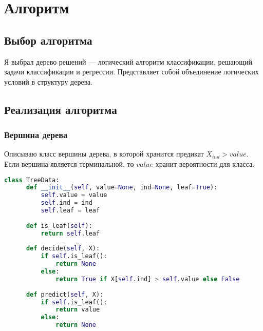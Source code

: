 \section{Алгоритм}
\subsection{Выбор алгоритма}
Я выбрал дерево решений --- логический алгоритм классификации, решающий задачи классификации и регрессии. Представляет собой объединение логических условий в структуру дерева.
\subsection{Реализация алгоритма}
\subsubsection{Вершина дерева}
Описываю класс вершины дерева, в которой хранится предикат $X_{ind} > value$. Если вершина является терминальной, то $value$ хранит вероятности для класса.
\begin{lstlisting}[language=python, keepspaces=true]
class TreeData:
      def __init__(self, value=None, ind=None, leaf=True):
          self.value = value
          self.ind = ind
          self.leaf = leaf
  
      def is_leaf(self):
          return self.leaf
  
      def decide(self, X):
          if self.is_leaf():
              return None
          else:
              return True if X[self.ind] > self.value else False
  
      def predict(self, X):
          if self.is_leaf():
              return value
          else:
              return None
\end{lstlisting}
\pagebreak
